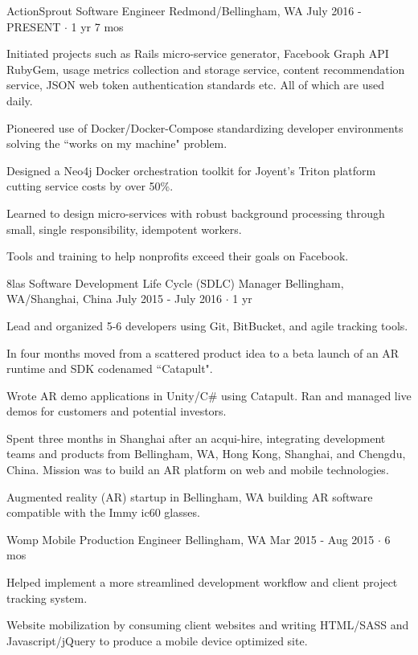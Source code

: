 \documentclass[11pt, a4paper]{awesome-cv}
\begin{document}
\begin{cventries}
  \cventry
    {ActionSprout} %
    {Software Engineer} %
    {Redmond/Bellingham, WA} %
    {July 2016 - PRESENT $\cdot$ 1 yr 7 mos} %
    {
      \begin{cvitems} %
        \item Initiated projects such as Rails micro-service generator, Facebook Graph API RubyGem, usage metrics collection and storage service, content recommendation service, JSON web token authentication standards etc. All of which are used daily.
        \item Pioneered use of Docker/Docker-Compose standardizing developer environments solving the ``works on my machine" problem.
        \item Designed a Neo4j Docker orchestration toolkit for Joyent's Triton platform cutting service costs by over 50\%.
        \item Learned to design micro-services with robust background processing through small, single responsibility, idempotent workers.
      \end{cvitems}
    }
    {
      Tools and training to help nonprofits exceed their goals on Facebook.
    }

  \cventry
    {8las} %
    {Software Development Life Cycle (SDLC) Manager} %
    {Bellingham, WA/Shanghai, China} %
    {July 2015 - July 2016 $\cdot$ 1 yr} %
    {
      \begin{cvitems} %
        \item Lead and organized 5-6 developers using Git, BitBucket, and agile tracking tools.
        \item In four months moved from a scattered product idea to a beta launch of an AR runtime and SDK codenamed ``Catapult".
        \item Wrote AR demo applications in Unity/C\# using Catapult. Ran and managed live demos for customers and potential investors.
        \item Spent three months in Shanghai after an acqui-hire, integrating development teams and products from Bellingham, WA, Hong Kong, Shanghai, and Chengdu, China. Mission was to build an AR platform on web and mobile technologies.
      \end{cvitems}
    }
    {
      Augmented reality (AR) startup in Bellingham, WA building AR software compatible with the Immy ic60 glasses.
    }

  \cventry
    {Womp Mobile} %
    {Production Engineer} %
    {Bellingham, WA} %
    {Mar 2015 - Aug 2015  $\cdot$ 6 mos} %
    {
      \begin{cvitems} %
        \item Helped implement a more streamlined development workflow and client project tracking system.
      \end{cvitems}
    }
    {
      Website mobilization by consuming client websites and writing HTML/SASS and Javascript/jQuery to produce a mobile device optimized site.
    }


\end{cventries}
\end{document}
